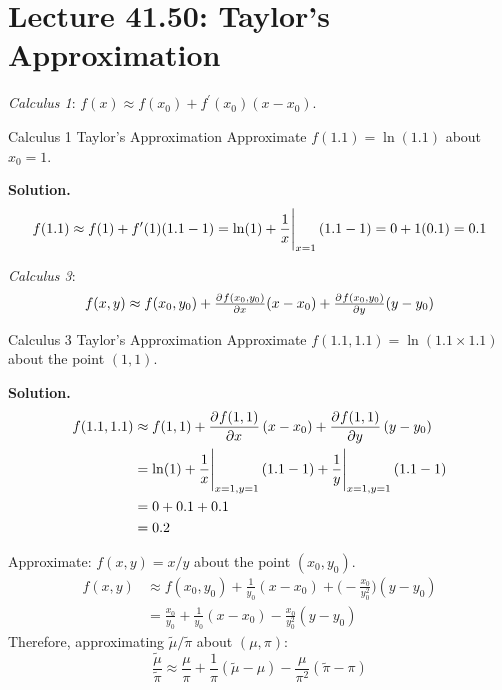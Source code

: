 \section{Lecture 41.50: Taylor's Approximation}
\emph{Calculus 1}: $ f(x)\approx f(x_0)+f^\prime(x_0)(x-x_0) $.
\begin{Example}{Calculus 1 Taylor's Approximation}{}
    Approximate $ f(1.1)=\ln(1.1) $ about $ x_0=1 $.

    \textbf{Solution.}
    \[ f(1.1)\approx f(1)+f^\prime(1)(1.1-1)=\ln(1)+\eval{\frac{1}{x}}_{x=1}(1.1-1)=0+1(0.1)=0.1 \]
\end{Example}
\emph{Calculus 3}:
\[ f(x,y)\approx f(x_0,y_0)+\pd{f(x_0,y_0)}{x}(x-x_0)+\pd{f(x_0,y_0)}{y}(y-y_0) \]
\begin{Example}{Calculus 3 Taylor's Approximation}{}
    Approximate $ f(1.1,1.1)=\ln(1.1\times 1.1) $ about the point $ (1,1) $.

    \textbf{Solution.}
    \begin{align*}
        f(1.1,1.1)
         & \approx f(1,1)+\dpd{f(1,1)}{x}(x-x_0)+\dpd{f(1,1)}{y}(y-y_0)                    \\
         & =\ln(1)+\eval{\frac{1}{x}}_{x=1,y=1}(1.1-1)+\eval{\frac{1}{y}}_{x=1,y=1}(1.1-1) \\
         & =0+0.1+0.1                                                                      \\
         & =0.2
    \end{align*}
\end{Example}
Approximate: $ f(x,y)=x/y $ about the point $ (x_0,y_0) $.
\begin{align*}
    f(x,y)
     & \approx f(x_0,y_0)+\frac{1}{y_0}(x-x_0)+\biggl(-\frac{x_0}{y_0^2} \biggr)(y-y_0) \\
     & =\frac{x_0}{y_0}+\frac{1}{y_0} (x-x_0)-\frac{x_0}{y_0^2}(y-y_0)
\end{align*}
Therefore, approximating $ \tilde{\mu}/\tilde{\pi} $ about $ (\mu,\pi) $:
\[ \frac{\tilde{\mu}}{\tilde{\pi}}\approx \frac{\mu}{\pi}+\frac{1}{\pi} (\tilde{\mu}-\mu)-\frac{\mu}{\pi^2}(\tilde{\pi}-\pi)   \]
